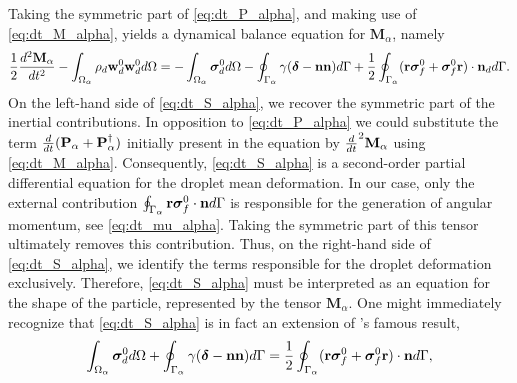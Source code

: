 Taking the symmetric part of \ref{eq:dt_P_alpha}, and making use of \ref{eq:dt_M_alpha}, yields a dynamical balance equation for $\textbf{M}_\alpha$, namely
\begin{equation}    
    \frac{1}{2}\frac{d^2 \textbf{M}_\alpha}{dt^2}
    - \intO{ \rho_d  \textbf{w}_d^0 \textbf{w}_d^0 }
    = 
    - \intO{\bm{\sigma}_d^0}
    - \intS{\gamma (\bm\delta - \textbf{nn})}
    + \frac{1}{2}\intS{(\textbf{r}\bm{\sigma}_f^0+\bm{\sigma}_f^0 \textbf{r})\cdot \textbf{n}_d}.
    \label{eq:dt_S_alpha}
\end{equation}
On the left-hand side of \ref{eq:dt_S_alpha}, we recover the symmetric part of the inertial contributions. 
In opposition to \ref{eq:dt_P_alpha} we could substitute the term $\frac{d}{dt} (\textbf{P}_\alpha+\textbf{P}_\alpha^\dagger)$ initially present in the equation by $\frac{d}{dt}^2 \textbf{M}_\alpha$ using \ref{eq:dt_M_alpha}. 
Consequently, \ref{eq:dt_S_alpha} is a second-order partial differential equation for the droplet mean deformation. 
In our case, only the external contribution $\oint_{\Gamma_{\alpha}} \textbf{r}\bm\sigma_f^0\cdot \textbf{n} d\Gamma$ is responsible for the generation of angular momentum, see \ref{eq:dt_mu_alpha}.
Taking the symmetric part of this tensor ultimately removes this contribution. 
Thus, on the right-hand side of \ref{eq:dt_S_alpha}, we identify the terms responsible for the droplet deformation exclusively.
Therefore, \ref{eq:dt_S_alpha} must be interpreted as an equation for the shape of the particle, represented by the tensor $\textbf{M}_\alpha$.
One might immediately recognize that \ref{eq:dt_S_alpha} is in fact an extension of \citet{batchelor1970stress}'s famous result, 
\begin{equation}
    \intO{\bm{\sigma}_d^0}
    + \intS{\gamma(\bm\delta - \textbf{nn})}
    = \frac{1}{2}\intS{(\textbf{r}\bm\sigma_f^0+\bm\sigma_f^0\textbf{r})\cdot \textbf{n}},
    \label{eq:Batchelor}
\end{equation}
